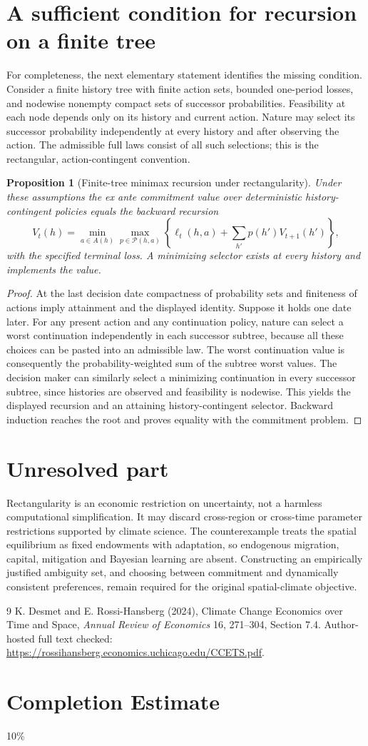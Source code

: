 \documentclass[11pt]{article}
\newtheorem{proposition}{Proposition}
\theoremstyle{definition}
\begin{document}
\section*{A sufficient condition for recursion on a finite tree}
For completeness, the next elementary statement identifies the missing condition. Consider a finite history tree with finite action sets, bounded one-period losses, and nodewise nonempty compact sets of successor probabilities. Feasibility at each node depends only on its history and current action. Nature may select its successor probability independently at every history and after observing the action. The admissible full laws consist of all such selections; this is the rectangular, action-contingent convention.

\begin{proposition}[Finite-tree minimax recursion under rectangularity]
Under these assumptions the ex ante commitment value over deterministic history-contingent policies equals the backward recursion
\[
 V_t(h)=\min_{a\in A(h)}\max_{p\in\mathcal P(h,a)}
 \left\{\ell_t(h,a)+\sum_{h'}p(h')V_{t+1}(h')\right\},
\]
with the specified terminal loss. A minimizing selector exists at every history and implements the value.
\end{proposition}
\begin{proof}
At the last decision date compactness of probability sets and finiteness of actions imply attainment and the displayed identity. Suppose it holds one date later. For any present action and any continuation policy, nature can select a worst continuation independently in each successor subtree, because all these choices can be pasted into an admissible law. The worst continuation value is consequently the probability-weighted sum of the subtree worst values. The decision maker can similarly select a minimizing continuation in every successor subtree, since histories are observed and feasibility is nodewise. This yields the displayed recursion and an attaining history-contingent selector. Backward induction reaches the root and proves equality with the commitment problem.
\end{proof}

\section*{Unresolved part}
Rectangularity is an economic restriction on uncertainty, not a harmless computational simplification. It may discard cross-region or cross-time parameter restrictions supported by climate science. The counterexample treats the spatial equilibrium as fixed endowments with adaptation, so endogenous migration, capital, mitigation and Bayesian learning are absent. Constructing an empirically justified ambiguity set, and choosing between commitment and dynamically consistent preferences, remain required for the original spatial-climate objective.
\begin{thebibliography}{9}
 K. Desmet and E. Rossi-Hansberg (2024), Climate Change Economics over Time and Space, \emph{Annual Review of Economics} 16, 271--304, Section 7.4. Author-hosted full text checked: \url{https://rossihansberg.economics.uchicago.edu/CCETS.pdf}.
\end{thebibliography}

\section{Completion Estimate}
10\%
\end{document}
